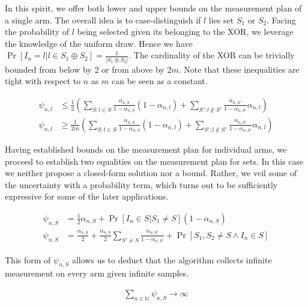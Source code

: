 In this spirit, we offer both lower and upper bounds on the measurement plan of
a single arm. The overall idea is to case-distinguish if $l$ lies set $S_1$ or
$S_2$. Facing the probability of $l$ being selected given its belonging to the
XOR, we leverage the knowledge of the uniform draw. Hence we have $\Pr[I_n = l|l
\in S_1 \oplus S_2] = \frac{1}{|S_1 \oplus S_2|}$. The cardinality of the XOR
can be trivially bounded from below by 2 or from above by 2$m$. Note that these
inequalities are tight with respect to $n$ as $m$ can be seen as a constant.
\begin{proposition}\label{proposition:measurement_plan_arm}
  \begin{align}
    \psi_{n, l} &\leq \frac{1}{2}(\sum_{S: l \in S} \frac{\alpha_{n, S}}{1 -
        \alpha_{n, S}} (1 - \alpha_{n, l}) +  \sum_{S': l \notin S'}
        \frac{\alpha_{n, S'}}{1 - \alpha_{n, S'}} \alpha_{n, l}) \\
    \psi_{n, l} &\geq \frac{1}{2m}(\sum_{S: l \in S} \frac{\alpha_{n, S}}{1 -
        \alpha_{n, S}} (1 - \alpha_{n, l}) +  \sum_{S': l \notin S'}
        \frac{\alpha_{n, S'}}{1 - \alpha_{n, S'}} \alpha_{n, l})
  \end{align}
\end{proposition}
Having established bounds on the measurement plan for individual arms, we
proceed to establish two equalities on the measurement plan for sets. In this
case we neither propose a closed-form solution nor a bound. Rather, we veil some
of the uncertainty with a probability term, which turns out to be sufficiently
expressive for some of the later applications.
\begin{proposition}\label{proposition:measurement_pan_set}
  \begin{align}
    \psi_{n, S} &= \frac{1}{2} \alpha_{n, S} +  \Pr[I_n \in S | S_1 \neq S] (1 - \alpha_{n, S}) \\
    \psi_{n, S} &= \frac{\alpha_{n, S}}{2} +  \frac{\alpha_{n, S}}{2} \sum_{S'\neq S} \frac{\alpha_{n, S'}}{1 - \alpha_{n, S'}} + \Pr[S_1, S_2 \neq S \wedge I_n \in S]
  \end{align}
\end{proposition}
This form of $\psi_{n, S}$ allows us to deduct that the algorithm collects infinite measurement on every arm given infinite samples.
\begin{lemma}\label{lemma:infinite_measurement}
  \begin{align}
    \sum_{n \in \mathbb{N}} \psi_{n, S} \rightarrow \infty
  \end{align}
\end{lemma}
